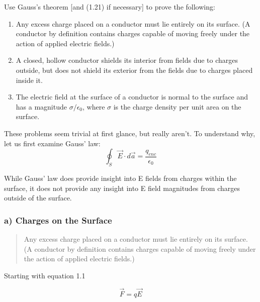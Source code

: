 \begin{question}
Use Gauss's theorem [and (1.21) if necessary] to prove the following:

  \begin{enumerate}[label=(\alph*)]

    \item Any excess charge placed on a conductor must lie entirely on
      its surface. (A conductor by definition contains charges capable
      of moving freely under the action of applied electric fields.)

    \item A closed, hollow conductor shields its interior from fields
      due to charges outside, but does not shield its exterior from
      the fields due to charges placed inside it.

    \item The electric field at the surface of a conductor is normal
      to the surface and has a magnitude $\sigma / \epsilon_0$, where
      $\sigma$ is the charge density per unit area on the surface.

  \end{enumerate}

\end{question}

These problems seem trivial at first glance, but really aren't.  To
understand why, let us first examine Gauss' law:
\begin{equation}
  \oint_S \vec{E} \cdot d\vec{a} = \frac{q_{enc}}{\epsilon_0}
\end{equation}

While Gauss' law does provide insight into E fields from charges
within the surface, it does not provide any insight into E field
magnitudes from charges outside of the surface.

\subsubsection*{a) Charges on the Surface}

\begin{quote}
Any excess charge placed on a conductor must lie entirely on its
surface. (A conductor by definition contains charges capable of moving
freely under the action of applied electric fields.)
\end{quote}

Starting with equation 1.1

\begin{equation}
\vec{F} = q\vec{E}
\end{equation}

